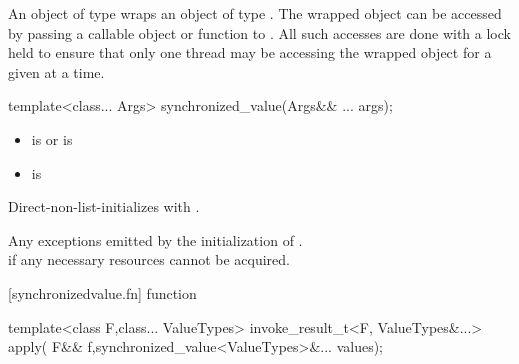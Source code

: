 \pnum   
An object of type 
wraps an object of type . The wrapped object can be accessed
by passing a callable object or function to . All such
accesses are done with a lock held to ensure that only one thread may be
accessing the wrapped object for a given  at
a time.

\begin{itemdecl}

template<class... Args>
synchronized_value(Args&& ... args);
\end{itemdecl}



\begin{itemdescr}
\pnum
\constraints
\begin{itemize}
\item 
   is  or
  is 
\item
   is
\end{itemize}
\pnum
\effects
Direct-non-list-initializes \emph{} with
.

\pnum
\throws
Any exceptions emitted by the initialization of \emph{}.\\
 if any necessary resources cannot be acquired.
\end{itemdescr}


[synchronizedvalue.fn]{ function }

\begin{itemdecl}
    template<class F,class... ValueTypes>
    invoke_result_t<F, ValueTypes&...> apply(
        F&& f,synchronized_value<ValueTypes>&... values);
\end{itemdecl}

